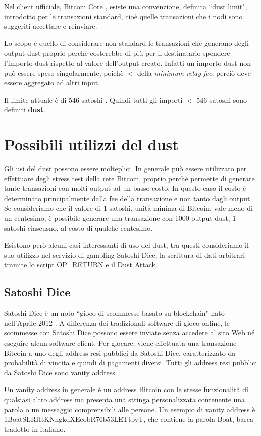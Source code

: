 Nel client ufficiale, Bitcoin Core \cite{btccore}, esiste una convenzione, definita ``dust limit", introdotto per le transazioni standard, cioè quelle transazioni che i nodi sono suggeriti accettare e reinviare.

Lo scopo è quello di considerare non-standard le transazioni che generano degli output dust proprio perchè costerebbe di più per il destinatario spendere l'importo dust rispetto al valore dell'output creato. Infatti un importo dust non può essere speso singolarmente, poichè $<$ della \textit{minimum relay fee}, perciò deve essere aggregato ad altri input.

Il limite attuale è di 546 satoshi \cite{BtcDev}. Quindi tutti gli importi $<$ 546 satoshi sono definiti \textbf{dust}.
\section{Possibili utilizzi del dust}
Gli usi del dust possono essere molteplici. In generale può essere utilizzato per effettuare degli stress test della rete Bitcoin, proprio perchè permette di generare tante transazioni con molti output ad un basso costo. In questo caso il costo è determinato principalmente dalla fee della transazione e non tanto dagli output. Se consideriamo che il valore di 1 satoshi, unità minima di Bitcoin, vale meno di un centesimo, è possibile generare una transazione con 1000 output dust, 1 satoshi ciascusno, al costo di qualche centesimo.

Esistono però alcuni casi interessanti di uso del dust, tra questi consideriamo il suo utilizzo nel servizio di gambling Satoshi Dice, la scrittura di dati arbitrari tramite lo script OP\_RETURN e il Dust Attack.
\subsection{Satoshi Dice}
Satoshi Dice è un noto ``gioco di scommesse basato su blockchain" nato nell'Aprile 2012 \cite{SD}. A differenza dei tradizionali software di gioco online, le scommesse con Satoshi Dice possono essere inviate senza accedere al sito Web né eseguire alcun software client. Per giocare, viene effettuata una transazione Bitcoin a uno degli address resi pubblici da Satoshi Dice, caratterizzato da probabilità di vincita e quindi di pagamenti diversi. Tutti gli address resi pubblici da Satoshi Dice sono vanity address.

Un vanity address in generale è un address Bitcoin con le stesse funzionalità di qualsiasi altro address ma presenta una stringa personalizzata contenente una parola o un messaggio comprensibili alle persone. Un esempio di vanity address è 1BoatSLRHtKNngkdXEeobR76b53LETtpyT, che contiene la parola Boat, barca tradotto in italiano. 

